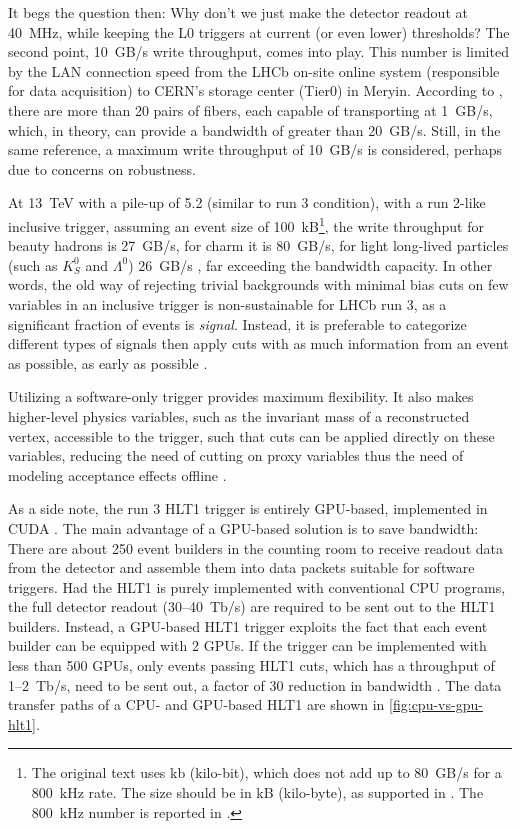 It begs the question then: Why don't we just make the detector readout at
40~MHz, while keeping the L0 triggers at current (or even lower) thresholds?
The second point, 10~GB/s write throughput,
comes into play.
This number is limited by the LAN connection speed from the LHCb on-site online
system (responsible for data acquisition) to CERN's storage center (Tier0) in
Meryin.
According to \cite{CERN-LHCC-2014-016},
there are more than 20 pairs of fibers, each capable of transporting at 1~GB/s,
which, in theory, can provide a bandwidth of greater than 20~GB/s.
Still, in the same reference, a maximum write throughput of 10~GB/s is
considered, perhaps due to concerns on robustness.

At 13~TeV with a pile-up of 5.2 (similar to run 3 condition),
with a run 2-like inclusive trigger,
assuming an event size of 100~kB\footnote{
    The original text uses kb (kilo-bit), which does not add up to 80~GB/s for
    a 800~kHz rate.
    The size should be in kB (kilo-byte), as supported in
    \cite{CERN-LHCC-2014-016,Allen_GPU_2020}.
    The 800~kHz number is reported in \cite{LHCb-PUB-2014-027}.
},
the write throughput for beauty hadrons is 27~GB/s, for charm it is 80~GB/s,
for light long-lived particles (such as $K^0_S$ and $\Lambda^0$) 26~GB/s
\cite{Albrecht_2014},
far exceeding the bandwidth capacity.
In other words,
the old way of rejecting trivial backgrounds with minimal bias cuts on few
variables in an inclusive trigger is non-sustainable for LHCb run 3,
as a significant fraction of events is \emph{signal}.
Instead, it is preferable to categorize different types of signals then apply
cuts with as much information from an event as possible, as early as possible
\cite{Albrecht_2014}.

Utilizing a software-only trigger provides maximum flexibility.
It also makes higher-level physics variables,
such as the invariant mass of a reconstructed vertex,
accessible to the trigger,
such that cuts can be applied directly on these variables,
reducing the need of cutting on proxy variables thus the need of modeling
acceptance effects offline \cite{Albrecht_2014}.

As a side note, the run 3 HLT1 trigger is entirely GPU-based, implemented in
CUDA \cite{Allen_GPU_2020}.
The main advantage of a GPU-based solution is to save bandwidth:
There are about 250 event builders in the counting room to receive readout data
from the detector and assemble them into data packets suitable for software
triggers.
Had the HLT1 is purely implemented with conventional CPU programs,
the full detector readout (30--40~Tb/s) are required to be sent out to the HLT1
builders.
Instead, a GPU-based HLT1 trigger exploits the fact that each event builder
can be equipped with 2 GPUs.
If the trigger can be implemented with less than 500 GPUs,
only events passing HLT1 cuts, which has a throughput of 1--2~Tb/s,
need to be sent out,
a factor of 30 reduction in bandwidth \cite{Allen_GPU_2020}.
The data transfer paths of a CPU- and GPU-based HLT1 are shown in
\cref{fig:cpu-vs-gpu-hlt1}.

